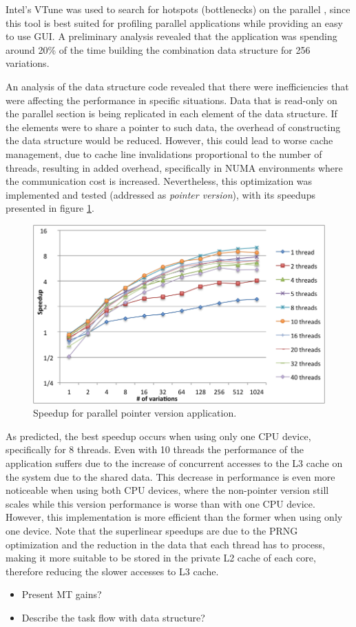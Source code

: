 Intel's VTune was used to search for hotspots (bottlenecks) on the parallel \tth, since this tool is best suited for profiling parallel applications while providing an easy to use GUI. A preliminary analysis revealed that the application was spending around 20\% of the time building the combination data structure for 256 variations.

An analysis of the data structure code revealed that there were inefficiencies that were affecting the performance in specific situations. Data that is read-only on the parallel section is being replicated in each element of the data structure. If the elements were to share a pointer to such data, the overhead of constructing the data structure would be reduced. However, this could lead to worse cache management, due to cache line invalidations proportional to the number of threads, resulting in added overhead, specifically in NUMA environments where the communication cost is increased. Nevertheless, this optimization was implemented and tested (addressed as \textit{pointer version}), with its speedups presented in figure \ref{fig:pointer_speedup}.

\begin{figure}[!htp]
	\begin{center}
		\includegraphics[scale=0.4]{charts/speedup_pointer_omp.png}
		\caption{Speedup for \tth parallel pointer version application.}
		\label{fig:pointer_speedup}
	\end{center}
\end{figure}

As predicted, the best speedup occurs when using only one CPU device, specifically for 8 threads. Even with 10 threads the performance of the application suffers due to the increase of concurrent accesses to the L3 cache on the system due to the shared data. This decrease in performance is even more noticeable when using both CPU devices, where the non-pointer version still scales while this version performance is worse than with one CPU device. However, this implementation is more efficient than the former when using only one device. Note that the superlinear speedups are due to the PRNG optimization and the reduction in the data that each thread has to process, making it more suitable to be stored in the private L2 cache of each core, therefore reducing the slower accesses to L3 cache.

\begin{itemize}
	\item Present MT gains?
	\item Describe the task flow with data structure?
\end{itemize}
